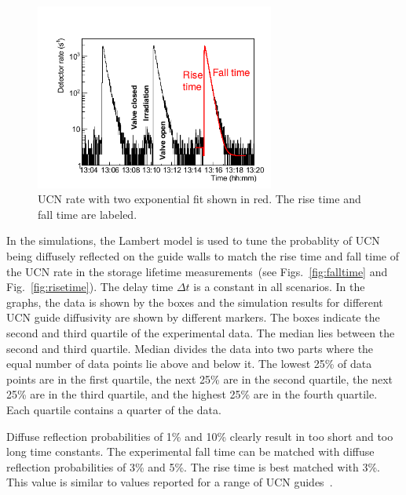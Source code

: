 \begin{figure}[h!]
  \centering
  \includegraphics[width=0.7\textwidth]{risefalltime.png}
  \caption[UCN cycle with a two exponential fit]{UCN rate with two
    exponential fit shown in red. The rise time and fall time are
    labeled.}
  \label{fig:risefalltime}
\end{figure}

In the simulations, the Lambert model is used to tune the probablity
of UCN being diffusely reflected on the guide walls to match the rise
time and fall time of the UCN rate in the storage lifetime
measurements~(see Figs.~\ref{fig:falltime} and
Fig.~\ref{fig:risetime}).  The delay time $\Delta t$ is a constant in
all scenarios.  In the graphs, the data is shown by the boxes and the
simulation results for different UCN guide diffusivity are shown by
different markers. The boxes indicate the second and third quartile of
the experimental data. The median lies between the second and third
quartile. Median divides the data into two parts where the equal
number of data points lie above and below it. The lowest 25\% of data
points are in the first quartile, the next 25\% are in the second
quartile, the next 25\% are in the third quartile, and the highest
25\% are in the fourth quartile. Each quartile contains a quarter of
the data.


Diffuse reflection probabilities of 1\% and 10\% clearly result in too
short and too long time constants. The experimental fall time can be
matched with diffuse reflection probabilities of 3\% and 5\%. The rise
time is best matched with 3\%. This value is similar to values
reported for a range of UCN
guides~\cite{DAUM201471,Wlokka2017,Atchison2010}.




